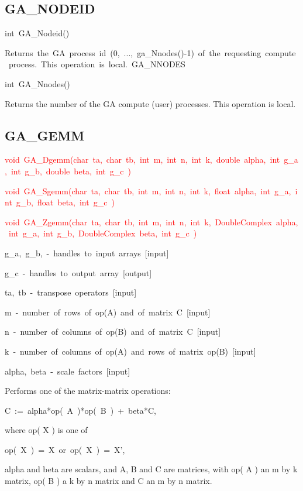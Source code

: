 \subsection*{GA\_NODEID}
\begin{lyxcode}
int~GA\_Nodeid()



Returns~the~GA~process~id~(0,~...,~ga\_Nnodes()-1)~of~the~requesting~compute~process.~This~operation~is~local.~GA\_NNODES

int~GA\_Nnodes()
\end{lyxcode}
Returns the number of the GA compute (user) processes. This operation
is local. 


\subsection*{GA\_GEMM}
\begin{lyxcode}
\textcolor{red}{void~GA\_Dgemm(char~ta,~char~tb,~int~m,~int~n,~int~k,~double~alpha,~int~g\_a,~int~g\_b,~double~beta,~int~g\_c~)~}

\textcolor{red}{void~GA\_Sgemm(char~ta,~char~tb,~int~m,~int~n,~int~k,~float~alpha,~int~g\_a,~int~g\_b,~float~beta,~int~g\_c~)~}

\textcolor{red}{void~GA\_Zgemm(char~ta,~char~tb,~int~m,~int~n,~int~k,~DoubleComplex~alpha,~int~g\_a,~int~g\_b,~DoubleComplex~beta,~int~g\_c~)}



g\_a,~g\_b,~-~handles~to~input~arrays~{[}input{]}~

g\_c~-~handles~to~output~array~{[}output{]}~

ta,~tb~-~transpose~operators~{[}input{]}~

m~-~number~of~rows~of~op(A)~and~of~matrix~C~{[}input{]}

n~-~number~of~columns~of~op(B)~and~of~matrix~C~{[}input{]}

k~-~number~of~columns~of~op(A)~and~rows~of~matrix~op(B)~{[}input{]}

alpha,~beta~-~scale~factors~{[}input{]}
\end{lyxcode}
Performs one of the matrix-matrix operations:
\begin{lyxcode}
C~:=~alpha{*}op(~A~){*}op(~B~)~+~beta{*}C,
\end{lyxcode}
where op( X ) is one of
\begin{lyxcode}
op(~X~)~=~X~or~op(~X~)~=~X',
\end{lyxcode}
alpha and beta are scalars, and A, B and C are matrices, with op(
A ) an m by k matrix, op( B ) a k by n matrix and C an m by n matrix.

